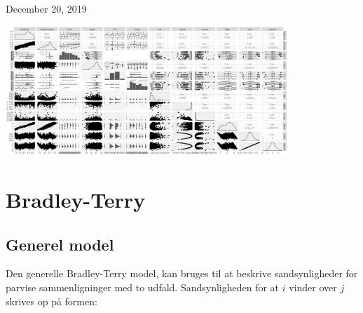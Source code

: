 \documentclass[11pt,a4paper]{article}
\renewcommand*\contentsname{Table of Contents}
\begin{document}
\begin{titlepage}
	
	
	\vfill\vfill\vfill %
	
	{\large{December 20, 2019}} %
	
	
	\includegraphics[width=0.8\textwidth]{kaosmuch.png}\\[1cm] %
	 
	
	\vfill %
	
\end{titlepage}
\renewcommand{\contentsname}{Indholdsfortegnelse}
\clearpage
\tableofcontents
\clearpage
\newpage
{}

\section{Bradley-Terry}
\subsection{Generel model}
Den generelle Bradley-Terry model, kan bruges til at beskrive sandsynligheder for parvise sammenligninger med to udfald. Sandsynligheden for at $i$ vinder over $j$ skrives op på formen: 
\end{document}
